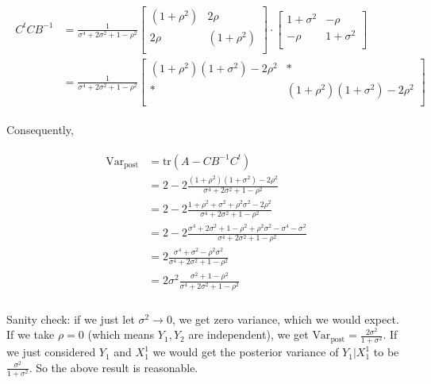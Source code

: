 \documentclass[paper=a4, fontsize=11pt]{scrartcl} %
\numberwithin{equation}{section} %
\numberwithin{figure}{section} %
\numberwithin{table}{section} %
\newcommand{\sig}{\sigma^2}
\newcommand{\var}{\text{Var}}
\newcommand{\post}{\text{post}} %
\newcommand{\tr}{\text{tr}}
\begin{document}
\begin{align}
 \begin{split}
C^tC B^{-1} &= 
\frac{1}{ \sigma^4 + 2\sig + 1 -\rho^2 }
\begin{bmatrix}   
 (1 +\rho^2)    &   2\rho  \\
 2\rho          &   (1 +\rho^2) \\ 
\end{bmatrix} 
\cdot
\begin{bmatrix}   
 1+\sig &   -\rho        \\
 -\rho      &   1+\sig   \\
\end{bmatrix} 
\\
&= \frac{1}{ \sigma^4 + 2\sig + 1 -\rho^2 }
  \begin{bmatrix}   
  (1 +\rho^2)(1+\sig) -2\rho^2    &   *                            \\
  *                               &  (1 +\rho^2)(1+\sig) -2\rho^2  \\ 
  \end{bmatrix} 
 \end{split}
\end{align}

Consequently,

\begin{align}
 \begin{split}
  \var_{\post} &= \tr(A- CB^{-1}C^t )\\
  &= 2 - 2\frac{(1 +\rho^2)(1+\sig) -2\rho^2}{ \sigma^4 + 2\sig + 1 -\rho^2 } \\
  &= 2 - 2\frac{1 +\rho^2 + \sig + \rho^2 \sig -2\rho^2}{ \sigma^4 + 2\sig + 1 -\rho^2 } \\
  &= 2 - 2\frac{ \sigma^4  + 2\sig +  1  -\rho^2 + \rho^2 \sig  -\sigma^4 - \sig}{ \sigma^4 + 2\sig + 1 -\rho^2 } \\
  &= 2\frac{   \sigma^4 + \sig - \rho^2 \sig}{ \sigma^4 + 2\sig + 1 -\rho^2 } \\
  &= 2\sig\frac{ \sig + 1 - \rho^2 }{ \sigma^4 + 2\sig + 1 -\rho^2 } \\
 \end{split}
\end{align}

Sanity check: if we just let $\sig  \to 0$, we get zero variance, which we would expect. If we take $\rho = 0$ (which means $Y_1, Y_2$ are independent),
we get $\var_{\post} = \frac{2\sig}{1+\sig}$. If we just considered $Y_1$ and $X_1^1$ we would get the posterior variance of
$Y_1 | X_1^1$ to be $\frac{\sig}{1+\sig}$. So the above result is reasonable.
\end{document}
